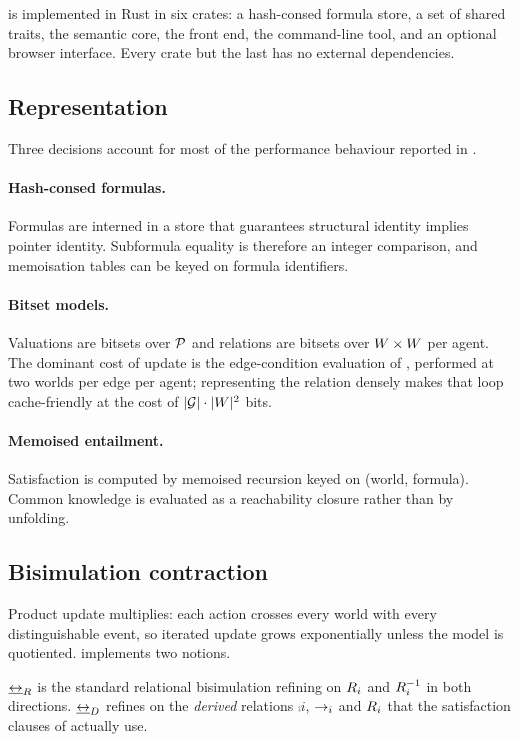 \documentclass[11pt,a4paper]{article}
\begin{document}
\delhi{} is implemented in Rust in six crates: a hash-consed formula store, a set of shared
traits, the semantic core, the front end, the command-line tool, and an optional browser
interface. Every crate but the last has no external dependencies.

\subsection{Representation}

Three decisions account for most of the performance behaviour reported in .

\paragraph{Hash-consed formulas.}
Formulas are interned in a store that guarantees structural identity implies pointer identity.
Subformula equality is therefore an integer comparison, and memoisation tables can be keyed on
formula identifiers.

\paragraph{Bitset models.}
Valuations are bitsets over $\mathcal{P}$ and relations are bitsets over $W \times W$
per agent. The dominant cost of update is the edge-condition evaluation of
, performed at two worlds per edge per agent; representing the relation
densely makes that loop cache-friendly at the cost of $|\mathcal{G}| \cdot |W|^2$ bits.

\paragraph{Memoised entailment.}
Satisfaction is computed by memoised recursion keyed on (world, formula). Common knowledge is
evaluated as a reachability closure rather than by unfolding.

\subsection{Bisimulation contraction}
\label{sec:bisim}

Product update multiplies: each action crosses every world with every distinguishable event,
so iterated update grows exponentially unless the model is quotiented. \delhi{} implements two
notions.

\begin{definition}
$\mathbin{\underline{\leftrightarrow}_{R}}$ is the standard relational bisimulation refining on $R_{i}$ and $R_{i}^{-1}$
in both directions. $\mathbin{\underline{\leftrightarrow}_{D}}$ refines on the \emph{derived} relations $\comp{i}$, $\rightarrow_{i}$
and $R_{i}$ that the satisfaction clauses of  actually use.
\end{definition}
\end{document}
